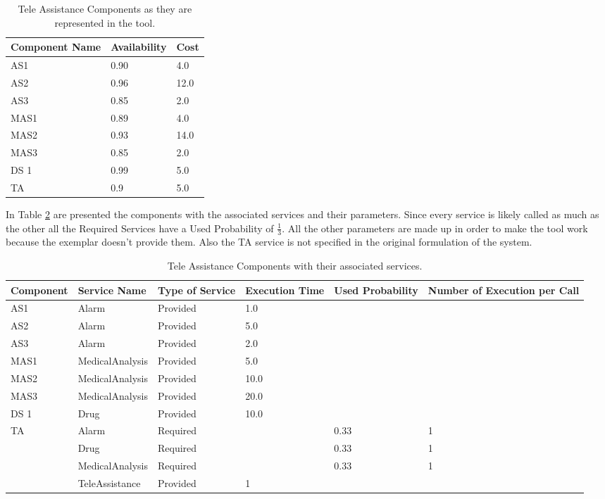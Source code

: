 \begin{table}[ht!b]
	\centering
	\begin{tabular}{|p{3cm}|p{2.5cm}|p{1cm}|}
		\hline 
		\textbf{Component Name} & \textbf{Availability} & \textbf{Cost} \\ 
		\hline 
		AS1 & 0.90 & 4.0 \\
		\hline 
		AS2 & 0.96 & 12.0 \\ 
		\hline 
		AS3 & 0.85 & 2.0 \\ 
		\hline 
		MAS1 & 0.89 & 4.0 \\ 
		\hline
		MAS2 & 0.93 & 14.0 \\ 
		\hline
		MAS3 & 0.85 & 2.0 \\ 
		\hline
		DS 1 & 0.99 & 5.0 \\ 
		\hline
		TA & 0.9 & 5.0 \\ 
		\hline
		
	\end{tabular} 
	\caption[TAS Components]{Tele Assistance Components as they are represented in the tool.}
	\label{tab:tas-comp}
\end{table}
In Table \ref{tab:tas-serv} are presented the components with the associated services and their parameters. Since every service is likely called as much as the other all the Required Services have a Used Probability of $ \frac{1}{3} $. All the other parameters are made up in order to make the tool work because the exemplar doesn't provide them. Also the TA service is not specified in the original formulation of the system.
\begin{table}[ht!b]
	\centering
	\begin{tabular}{|p{2cm}|p{2.5cm}|p{1.4cm}|p{1.7cm}|p{1.5cm}|p{1.8cm}|}
		\hline 
		\textbf{Component} & \textbf{Service Name} & \textbf{Type of Service} & \textbf{Execution Time} & \textbf{Used Probability} & \textbf{Number of Execution per Call} \\ 
		\hline 
		AS1 & Alarm & Provided & 1.0 & & \\
		\hline 
		AS2 & Alarm & Provided & 5.0 & & \\
		\hline 
		AS3 & Alarm & Provided & 2.0 & & \\
		\hline 
		MAS1 & MedicalAnalysis & Provided & 5.0 & & \\ 
		\hline
		MAS2 & MedicalAnalysis & Provided & 10.0 & & \\ 
		\hline
		MAS3 & MedicalAnalysis & Provided & 20.0 & & \\ 
		\hline
		DS 1 & Drug & Provided & 10.0 & & \\
		\hline
		\multirow{4}{*}{TA} & Alarm & Required & & 0.33 & 1 \\
		& Drug & Required & & 0.33 & 1 \\
		& MedicalAnalysis & Required & & 0.33 & 1 \\\cline{2-6}
		& TeleAssistance & Provided & 1 & & \\
		\hline
		
	\end{tabular} 
	\caption[TAS Service]{Tele Assistance Components with their associated services.}
	\label{tab:tas-serv}
\end{table}

